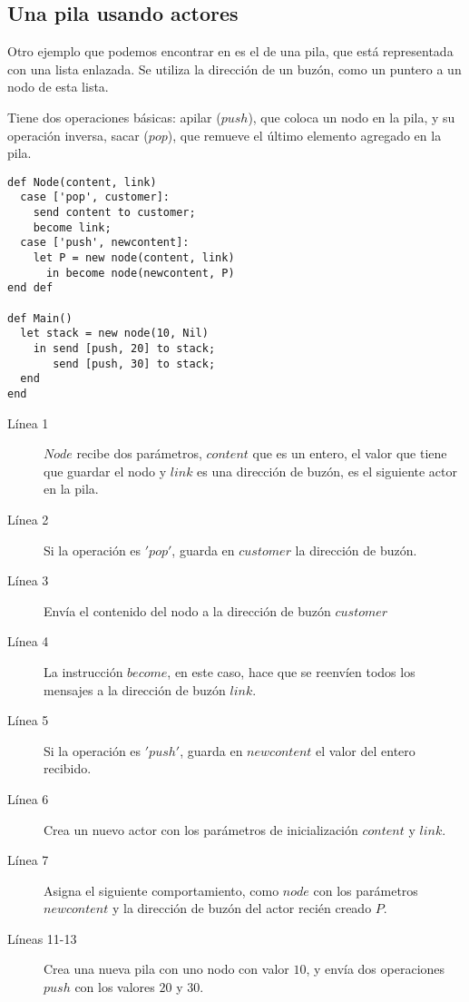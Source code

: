 \subsection{Una pila usando actores}\label{sal:pila}

Otro ejemplo que podemos encontrar en \cite{Agha:1986:AMC:7929} es el de una pila, que está representada con una lista enlazada. Se utiliza la dirección de un buzón, como un puntero a un nodo de esta lista. 

Tiene dos operaciones básicas: apilar ($push$), que coloca un nodo en la pila, y su operación inversa, sacar ($pop$), que remueve el último elemento agregado en la pila.

\begin{lstlisting}[language=sal, style=simple]
def Node(content, link)
  case ['pop', customer]:
    send content to customer;
    become link;
  case ['push', newcontent]:
    let P = new node(content, link)
      in become node(newcontent, P)
end def

def Main() 
  let stack = new node(10, Nil)
    in send [push, 20] to stack;
       send [push, 30] to stack;
  end
end
\end{lstlisting}

\begin{description}

\item [Línea 1] $Node$ recibe dos parámetros, $content$ que es un entero, el valor que tiene que guardar el nodo y  $link$ es una dirección de buzón, es el siguiente actor en la pila.
\item [Línea 2] Si la operación es $'pop'$, guarda en $customer$ la dirección de buzón.
\item [Línea 3] Envía el contenido del nodo a la dirección de buzón $customer$
\item [Línea 4] La instrucción $become$, en este caso, hace que se reenvíen todos los mensajes a la dirección de buzón $link$. 
\item [Línea 5] Si la operación es $'push'$, guarda en $newcontent$ el valor del entero recibido.
\item [Línea 6] Crea un nuevo actor con los parámetros de inicialización $content$ y $link$.
\item [Línea 7] Asigna el siguiente comportamiento, como $node$ con los parámetros $newcontent$ y la dirección de buzón del actor recién creado $P$. 
\item [Líneas 11-13] Crea una nueva pila con uno nodo con valor $10$, y envía dos operaciones $push$ con los valores $20$ y $30$.
\end{description}

